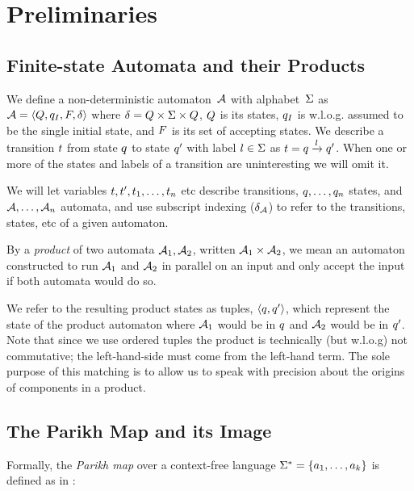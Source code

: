 \documentclass[acmsmall,review,anonymous]{acmart}\settopmatter{printfolios=true,printccs=false,printacmref=true}
\theoremstyle{definition}
\begin{document}
\section{Preliminaries}

\subsection{Finite-state Automata and their Products}
We define a non-deterministic automaton~$\mathcal{A}$ with alphabet~$\Sigma$
as $\mathcal{A} = \left\langle Q, q_I, F, \delta\right\rangle$ where $\delta = Q \times \Sigma
\times Q$, $Q$ is its states, $q_I$ is w.l.o.g. assumed to
be the single initial state, and $F$ is its set of accepting
states.  We describe a transition $t$ from state $q$ to state
$q'$ with label $l \in \Sigma$ as $t =
q \xrightarrow{l} q'$. When one or more of the states and
labels of a transition are uninteresting we will omit it.

We will let variables $t, t', t_1, \ldots,
t_n$ etc describe transitions, $q, \ldots, q_n$ states, and
$\mathcal{A}, \ldots, \mathcal{A}_n$ automata, and use subscript indexing
($\delta_{\mathcal{A}}$) to refer to the transitions, states, etc of a given
automaton.

By a \emph{product} of two automata $\mathcal{A}_1, \mathcal{A}_2$, written
$\mathcal{A}_1 \times \mathcal{A}_2$, we mean an automaton constructed to run
$\mathcal{A}_1$ and $\mathcal{A}_2$ in parallel on an input and only accept the
input if both automata would do so.

We refer to the resulting product states as tuples, $\left\langle q, q'\right\rangle$,
which represent the state of the product automaton where $\mathcal{A}_1$ would be
in $q$ and $\mathcal{A}_2$ would be in $q'$. Note that since we use
ordered tuples the product is technically (but w.l.o.g) not commutative; the
left-hand-side must come from the left-hand term. The sole purpose of this
matching is to allow us to speak with precision about the origins of components
in a product.

\subsection{The Parikh Map and its Image}
Formally, the \textit{Parikh map} over a context-free language $\Sigma^*=
\left\{a_1, \ldots, a_k \right\}$ is defined as in \cite{kozen}:
\end{document}
